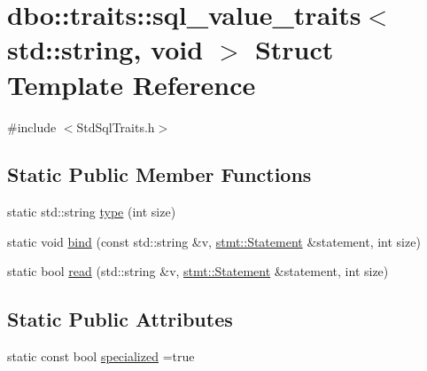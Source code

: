 \hypertarget{structdbo_1_1traits_1_1sql__value__traits_3_01std_1_1string_00_01void_01_4}{\section{dbo\+:\+:traits\+:\+:sql\+\_\+value\+\_\+traits$<$ std\+:\+:string, void $>$ Struct Template Reference}
\label{structdbo_1_1traits_1_1sql__value__traits_3_01std_1_1string_00_01void_01_4}
}


{\ttfamily \#include $<$Std\+Sql\+Traits.\+h$>$}

\subsection*{Static Public Member Functions}
\begin{DoxyCompactItemize}
\item 
static std\+::string \hyperlink{structdbo_1_1traits_1_1sql__value__traits_3_01std_1_1string_00_01void_01_4_ac791b5665117c457a0ae39496bff3426}{type} (int size)
\item 
static void \hyperlink{structdbo_1_1traits_1_1sql__value__traits_3_01std_1_1string_00_01void_01_4_a12d09be7436178384d5e435b79c84803}{bind} (const std\+::string \&v, \hyperlink{classdbo_1_1stmt_1_1_statement}{stmt\+::\+Statement} \&statement, int size)
\item 
static bool \hyperlink{structdbo_1_1traits_1_1sql__value__traits_3_01std_1_1string_00_01void_01_4_ace7c68de7990db2ac143e395384fc729}{read} (std\+::string \&v, \hyperlink{classdbo_1_1stmt_1_1_statement}{stmt\+::\+Statement} \&statement, int size)
\end{DoxyCompactItemize}
\subsection*{Static Public Attributes}
\begin{DoxyCompactItemize}
\item 
static const bool \hyperlink{structdbo_1_1traits_1_1sql__value__traits_3_01std_1_1string_00_01void_01_4_ac2cff372a82208819695e1cb7761eee0}{specialized} =true
\end{DoxyCompactItemize}


